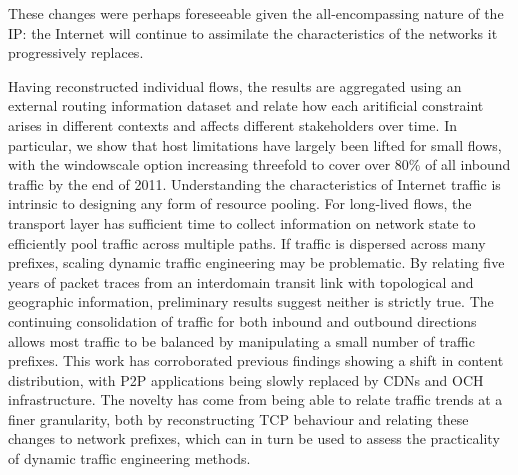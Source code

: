 These changes were perhaps foreseeable given the all-encompassing nature of the \ac{IP}: the Internet will continue to assimilate the characteristics of the networks it progressively replaces.







Having reconstructed individual flows, the results are aggregated using an external routing information dataset and relate how each aritificial constraint arises in different contexts and affects different stakeholders over time. 
In particular, we show that host limitations have largely been lifted for small flows, with the windowscale option increasing threefold to cover over 80\% of all inbound traffic by the end of 2011. 
Understanding the characteristics of Internet traffic is intrinsic to designing any form of resource pooling.
For long-lived flows, the transport layer has sufficient time to collect information on network state to efficiently pool traffic across multiple paths.
If traffic is dispersed across many prefixes, scaling dynamic traffic engineering may be problematic.
By relating five years of packet traces from an interdomain transit link with topological and geographic information, preliminary results suggest neither is strictly true.
The continuing consolidation of traffic for both inbound and outbound directions allows most traffic to be balanced by manipulating a small number of traffic prefixes.
This work has corroborated previous findings \cite{Labovitz:2010p175} showing a shift in content distribution, with \acf{P2P} applications being slowly replaced by \acfp{CDN} and \acf{OCH} infrastructure.
The novelty has come from being able to relate traffic trends at a finer granularity, both by reconstructing \ac{TCP} behaviour and relating these changes to network prefixes, which can in turn be used to assess the practicality of dynamic traffic engineering methods.


